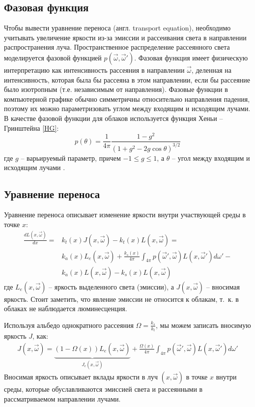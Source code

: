 \subsection{Фазовая функция}
Чтобы вывести уравнение переноса (англ. transport equation), необходимо учитывать увеличение яркости из-за эмиссии и рассеивания света в направлении распространения луча. Пространственное распределение рассеянного света моделируется фазовой функцией $ p(\vec{\omega}, \vec{\omega}') $. Фазовая функция имеет физическую интерпретацию как интенсивность рассеяния в направлении $\vec{\omega}$, деленная на интенсивность, которая была бы рассеяна в этом направлении, если бы рассеяние было изотропным (т.е. независимым от направления). Фазовые функции в компьютерной графике обычно симметричны относительно направления падения, поэтому их можно параметризовать углом между входящим и исходящим лучами. В качестве фазовой функции для облаков используется функция Хеньи -- Гринштейна \eqref{HG}:
\begin{equation}
	\label{HG}
	p(\theta) = \frac{1}{4\pi} \frac{1 - g^2}{(1 + g^2 - 2g\cos \theta)^{3/2}}
\end{equation}
где $ g $ -- варьируемый параметр, причем $ -1 \leq g \leq 1 $, а $\theta$ -- угол между входящим и исходящим лучами \cite{clouds}.

\subsection{Уравнение переноса}
Уравнение переноса описывает изменение яркости внутри участвующей среды в точке $ x $:
\begin{equation}
	\label{rte}
	\begin{aligned}
		\frac{dL(x, \vec{\omega})}{dx} = & k_t(x) J(x, \vec{\omega}) - k_t(x) L(x, \vec{\omega})  = \\
		& k_a(x) L_e(x, \vec{\omega}) + \frac{k_s(x)}{4\pi} \int_{4\pi} p(\vec{\omega}', \vec{\omega}) L(x, \vec{\omega}') d\omega' - \\
		& k_a(x) L(x, \vec{\omega}) - k_s(x) L(x, \vec{\omega})	
	\end{aligned}
\end{equation}
где $ L_e(x, \vec{\omega}) $ -- яркость выделенного света (эмиссии), а $ J(x, \vec{\omega}) $ -- вносимая яркость. Стоит заметить, что явление эмиссии не относится к облакам, т.~к. в облаках не наблюдается люминесценция.    

Используя альбедо однократного рассеяния $ \Omega = \frac{k_s}{k_t} $, мы можем записать вносимую яркость $J$, как:
\begin{equation}
	\label{sourcerad}
	\begin{aligned}
		J(x, \vec{\omega}) = \underbrace{(1 - \Omega(x)) L_e(x, \vec{\omega})}_{J_e(x, \vec{\omega})} + \frac{\Omega(x)}{4\pi} \int_{4\pi} p(\vec{\omega}', \vec{\omega}) L(x, \vec{\omega}') d\omega'
	\end{aligned}
\end{equation}
Вносимая яркость описывает вклады яркости в луч $ (x, \vec{\omega}) $ в точке $ x $ внутри среды, которые обуславливаются эмиссией света и рассеянными в рассматриваемом направлении лучами. 


